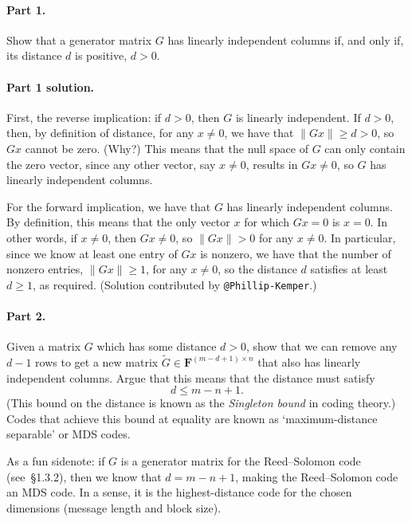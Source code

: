 \documentclass[12pt,hidelinks]{article}
\newcommand{\field}{\mathbf{F}}
\begin{document}
\paragraph{Part 1.} Show that a generator matrix $G$ has linearly independent
columns if, and only if, its distance $d$ is positive, $d > 0$.

\begin{solution}
\paragraph{Part 1 solution.} First, the reverse implication: if $d > 0$, then
$G$ is linearly independent. If $d > 0$, then, by definition of distance, for
any $x \ne 0$, we have that $\|Gx\| \ge d > 0$, so $Gx$ cannot be zero. (Why?)
This means that the null space of $G$ can only contain the zero vector, since
any other vector, say $x \ne 0$, results in $Gx \ne 0$, so $G$ has linearly
independent columns.

For the forward implication, we have that $G$ has linearly independent columns.
By definition, this means that the only vector $x$ for which $Gx = 0$ is $x =
0$. In other words, if $x \ne 0$, then $Gx \ne 0$, so $\|Gx\| > 0$ for any $x
\ne 0$. In particular, since we know at least one entry of $Gx$ is nonzero, we
have that the number of nonzero entries, $\|Gx\| \ge 1$, for any $x\ne 0$, so
the distance $d$ satisfies at least $d \ge 1$, as required.
(Solution contributed by \verb|@Phillip-Kemper|.)

\end{solution}

\paragraph{Part 2.} Given a matrix $G$ which has some distance $d > 0$, show
that we can remove any $d-1$ rows to get a new matrix $\tilde G \in
\field^{(m-d + 1)\times n}$ that also has linearly independent columns. Argue
that this means that the distance must satisfy
\[
    d \le m - n + 1.
\]
(This bound on the distance is known as the \emph{Singleton bound} in coding
theory.) Codes that achieve this bound at equality are known as
`maximum-distance separable' or MDS codes.

As a fun sidenote: if $G$ is a generator matrix for the Reed--Solomon code
(see~\S1.3.2), then we know that $d = m - n + 1$, making the Reed--Solomon code
an MDS code. In a sense, it is the highest-distance code for the chosen
dimensions (message length and block size).
\end{document}
